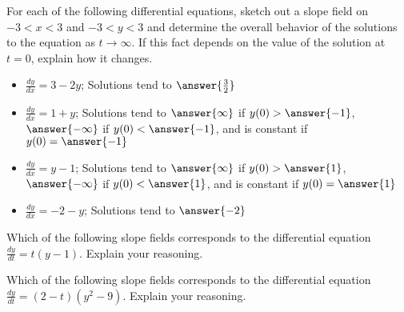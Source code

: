 \documentclass{ximera}
\begin{document}
\begin{exercise}
    For each of the following differential equations, sketch out a slope field on $-3 < x < 3$ and $-3 < y < 3$ and determine the overall behavior of the solutions to the equation as $t \rightarrow \infty$. If this fact depends on the value of the solution at $t=0$, explain how it changes.
    \begin{itemize}
        \item $\displaystyle \frac{dy}{dx} = 3 - 2y$; Solutions tend to $\answer{\frac{3}{2}}$
        \item $\displaystyle \frac{dy}{dx} = 1 + y$; Solutions tend to $\answer{\infty}$ if $y(0) > \answer{-1}$, $\answer{-\infty}$ if $y(0) < \answer{-1}$, and is constant if $y(0) = \answer{-1}$
        \item $\displaystyle \frac{dy}{dx} = y - 1$; Solutions tend to $\answer{\infty}$ if $y(0) > \answer{1}$, $\answer{-\infty}$ if $y(0) < \answer{1}$, and is constant if $y(0) = \answer{1}$
        \item $\displaystyle \frac{dy}{dx} = -2 - y$; Solutions tend to $\answer{-2}$
    \end{itemize}
\end{exercise}
%

\begin{exercise}
    Which of the following slope fields corresponds to the differential equation $\frac{dy}{dt} = t(y-1)$. Explain your reasoning.
    \begin{multipleChoice}
    \end{multipleChoice}
\end{exercise}

\begin{exercise}
    Which of the following slope fields corresponds to the differential equation $\frac{dy}{dt} = (2-t)(y^2 - 9)$. Explain your reasoning.
    \begin{multipleChoice}
    \end{multipleChoice}
\end{exercise}
\end{document}
